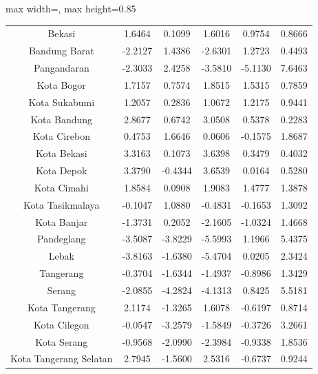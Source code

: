 \begin{table}[H]
\begin{adjustbox}{max width=\textwidth, max height=0.85\textheight}
\begin{tabular}{|c|c|c|c|c|c|}
Bekasi & 1.6464 & 0.1099 & 1.6016 & 0.9754 & 0.8666 \\
Bandung Barat & -2.2127 & 1.4386 & -2.6301 & 1.2723 & 0.4493 \\
Pangandaran & -2.3033 & 2.4258 & -3.5810 & -5.1130 & 7.6463 \\
Kota Bogor & 1.7157 & 0.7574 & 1.8515 & 1.5315 & 0.7859 \\
Kota Sukabumi & 1.2057 & 0.2836 & 1.0672 & 1.2175 & 0.9441 \\
Kota Bandung & 2.8677 & 0.6742 & 3.0508 & 0.5378 & 0.2283 \\
Kota Cirebon & 0.4753 & 1.6646 & 0.0606 & -0.1575 & 1.8687 \\
Kota Bekasi & 3.3163 & 0.1073 & 3.6398 & 0.3479 & 0.4032 \\
Kota Depok & 3.3790 & -0.4344 & 3.6539 & 0.0164 & 0.5280 \\
Kota Cimahi & 1.8584 & 0.0908 & 1.9083 & 1.4777 & 1.3878 \\
Kota Tasikmalaya & -0.1047 & 1.0880 & -0.4831 & -0.1653 & 1.3092 \\
Kota Banjar & -1.3731 & 0.2052 & -2.1605 & -1.0324 & 1.4668 \\
Pandeglang & -3.5087 & -3.8229 & -5.5993 & 1.1966 & 5.4375 \\
Lebak & -3.8163 & -1.6380 & -5.4704 & 0.0205 & 2.3424 \\
Tangerang & -0.3704 & -1.6344 & -1.4937 & -0.8986 & 1.3429 \\
Serang & -2.0855 & -4.2824 & -4.1313 & 0.8425 & 5.5181 \\
Kota Tangerang & 2.1174 & -1.3265 & 1.6078 & -0.6197 & 0.8714 \\
Kota Cilegon & -0.0547 & -3.2579 & -1.5849 & -0.3726 & 3.2661 \\
Kota Serang & -0.9568 & -2.0990 & -2.3984 & -0.9338 & 1.8536 \\
Kota Tangerang Selatan & 2.7945 & -1.5600 & 2.5316 & -0.6737 & 0.9244 \\
\hline
\end{tabular}
\end{adjustbox}
\end{table}
